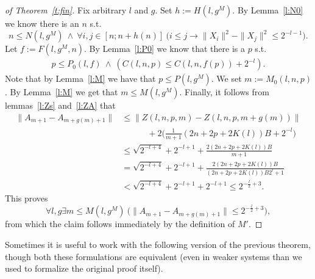 \begin{proof}[ of Theorem~\ref{t:fin}]
Fix arbitrary $l$ and $g$. Set $h:= H(l,g^M)$.
By Lemma~\ref{l:N0} we know there is an $n$ s.t.  
\[
n\leq N(l,g^M)\ \wedge\ \forall i,j\in[n;n+h(n)]\ 
\big( i\leq j\rightarrow \|X_i\|^2-\|X_j\|^2\leq 2^{-l-1} \big). %
\]
Let $f:=F(l,g^M,n)$. By Lemma~\ref{l:P0} we know that there is a $p$ s.t.
\begin{align*}
p\leq P_0(l,f)\ \wedge\ ( C(l,n,p)\leq C(l,n,f(p)) + 2^{-l}  ).  %
\end{align*}
Note that by Lemma~\ref{l:M} we have that $p\leq P(l,g^M)$. We set $m:=M_0(l,n,p)$. By Lemma~\ref{l:M} we get that $m\leq M(l,g^M)$.
Finally, it follows from lemmas~\ref{l:Zs} and~\ref{l:ZA} that
\begin{align*}
\|A_{m+1} - A_{m+g(m)+1}\| &\leq \|Z( l,n,p,m ) - Z( l,n,p,m+g(m) )\|\\
		&\quad\quad\quad + 2\Big(\frac{1}{m+1}(2n + 2p + 2K(l))B +2^{-l}\Big)\\
		&\leq \sqrt{2^{-l+4}} + 2^{-l+1} + \frac{2(2n + 2p + 2K(l))B}{m+1} \\
		&= \sqrt{2^{-l+4}} + 2^{-l+1} + \frac{2(2n + 2p + 2K(l))B}{(2n + 2p + 2K(l))B2^{l}+1} \\
		&< \sqrt{2^{-l+4}} + 2^{-l+1} + 2^{-l+1} \leq 2^{-\frac{l}{2}+3}.
\end{align*}
This proves 
\[
\forall l,g \exists m\leq M(l,g^M)\ \big( \|A_{m+1}-A_{m+g(m)+1}\|\leq 2^{-\frac{l}{2}+3}\big),
\]
from which the claim follows immediately by the definition of $M'$.
\end{proof}

Sometimes it is useful to work with the following version of the previous theorem, though
both these formulations are equivalent (even in weaker systems than we used to
formalize the original proof itself).

